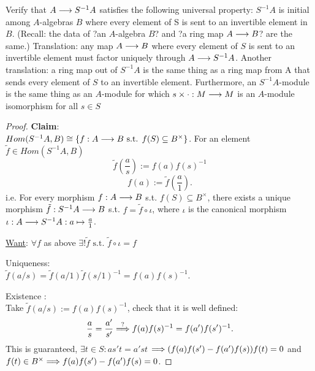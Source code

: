 \begin{exr}
Verify that $A\longrightarrow S^{-1}A$ satisfies the following universal property: $S^{-1}A$ is initial among $A$-algebras $B$ where every element of S is sent to an invertible element in $B$. (Recall: the data of ?an $A$-algebra $B$? and ?a ring map $A \longrightarrow B$? are the same.) Translation: any map $A \longrightarrow B $ where every element of $S$ is sent to an invertible element must factor uniquely through $A\longrightarrow S^{-1}A$. Another translation: a ring map out of $S^{-1}A$ is the same thing as a ring map from A that sends every element of $S$ to an invertible element. Furthermore, an $S^{-1}A$-module is the same thing as an $A$-module for which $s\times\cdot : M\longrightarrow M$ is an $A$-module isomorphism for all $s \in S$
\end{exr}
\begin{proof}
\textbf{Claim}:\\
$Hom(S^{-1}{A},{B})\cong \{f:{A}\longrightarrow {B}\text{ s.t. } f(S)\subseteq {B}^{\times}\}$. 
For an element $\tilde{f}\in Hom(S^{-1}{A},{B})$
$$
\tilde{f}\left(\frac{a}{s}\right):=f(a)f(s)^{-1}
$$
$$
f(a):=\tilde{f}\left(\frac{a}{1}\right).
$$
i.e. For every morphism $f:{A}\longrightarrow{B}$ s.t. $f(S)\subseteq {B}^{\times}$, there exists a unique morphism $\tilde{f}:S^{-1}{A}\longrightarrow {B}$ s.t. $f=\tilde{f}\circ\iota$, where $\iota $ is the canonical morphism $\iota:{A}\longrightarrow S^{-1}{A}:a\mapsto \frac{a}{1}$.
\begin{center}
\end{center}

\underline{Want}: $\forall f$ as above $\exists ! \tilde{f}\text{ s.t. } \tilde{f}\circ\iota=f$

Uniqueness:\\
$\tilde{f}(a/s)=\tilde{f}(a/1)\tilde{f}(s/1)^{-1}=f(a)f(s)^{-1}$.

Existence :\\
Take $\tilde{f}(a/s):=f(a)f(s)^{-1}$, check that it is well defined:
$$
\frac{a}{s}=\frac{a'}{s'}\overset{?}{\Longrightarrow} f(a)f(s)^{-1}=f(a')f(s')^{-1}.
$$
This is guaranteed, $\exists t\in S: as' t=a's t$ $\Longrightarrow (f(a)f(s')-f(a')f(s))f(t)=0$ and $f(t)\in {B}^{\times}\Longrightarrow f(a)f(s')-f(a')f(s)=0$.
\end{proof}

